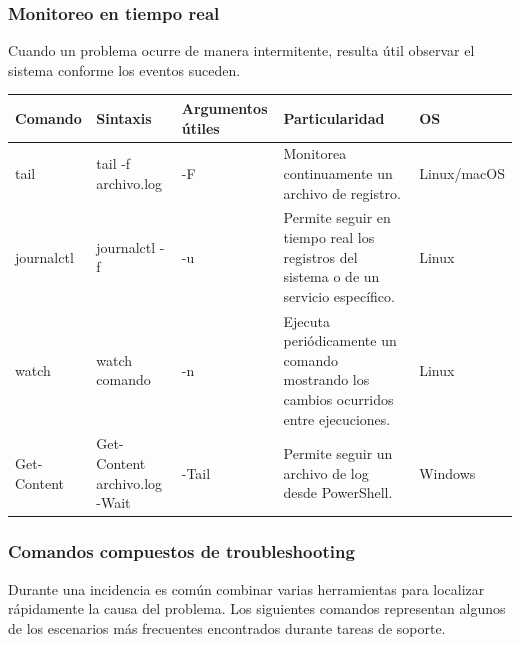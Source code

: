 \documentclass[a4paper,10pt]{article}
\begin{document}
\subsubsection{Monitoreo en tiempo real}

Cuando un problema ocurre de manera intermitente, resulta útil observar el
sistema conforme los eventos suceden.

\begin{longtable}{|p{2.8cm}|p{3.3cm}|p{4cm}|p{5.3cm}|p{1.5cm}|}

\hline
Comando &
Sintaxis &
Argumentos útiles &
Particularidad &
OS
\\
\hline
\endhead

tail &
tail -f archivo.log &
-F &
Monitorea continuamente un archivo de registro. &
Linux/macOS
\\
\hline

journalctl &
journalctl -f &
-u &
Permite seguir en tiempo real los registros del sistema o de un servicio específico. &
Linux
\\
\hline

watch &
watch comando &
-n &
Ejecuta periódicamente un comando mostrando los cambios ocurridos entre ejecuciones. &
Linux
\\
\hline

Get-Content &
Get-Content archivo.log -Wait &
-Tail &
Permite seguir un archivo de log desde PowerShell. &
Windows
\\
\hline

\end{longtable}


\subsubsection{Comandos compuestos de troubleshooting}

Durante una incidencia es común combinar varias herramientas para localizar
rápidamente la causa del problema. Los siguientes comandos representan algunos
de los escenarios más frecuentes encontrados durante tareas de soporte.
\end{document}
